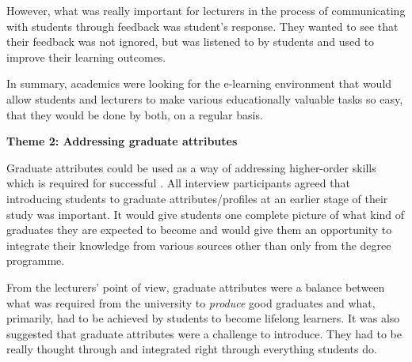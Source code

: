 
However, what was really important for lecturers in the process of communicating
with students through feedback was student's response. They wanted to see that
their feedback was not ignored, but was listened to by students and used to
improve their learning outcomes.


In summary, academics were looking for the e-learning environment that would
allow students and lecturers to make various educationally valuable tasks so easy,
that they would be done by both, on a regular basis.

\textbf{Theme 2: Addressing graduate attributes}

Graduate attributes could be used as a way of addressing higher-order skills
which is required for successful \LLLs \citep{Hart1999}. All interview
participants agreed that introducing students to graduate attributes/profiles at
an earlier stage of their study was important. It would give students one
complete picture of what kind of graduates they are expected to become and would
give them an opportunity to integrate their knowledge from various sources other
than only from the degree programme.


From the lecturers' point of view, graduate attributes were a balance between
what was required from the university to \textit{produce} good graduates and
what, primarily, had to be achieved by students to become lifelong learners. It
was also suggested that graduate attributes were a challenge to introduce. They
had to be really thought through and integrated right through everything
students do.

